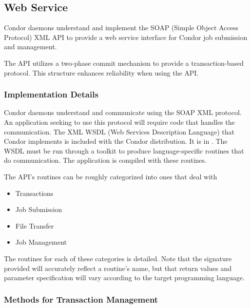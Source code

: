 \subsection{\label{API-WebService} Web Service}

Condor daemons understand and implement
the SOAP (Simple Object Access Protocol) XML API
to provide a web service interface for Condor job submission
and management.

The API utilizes a two-phase commit mechanism to provide
a transaction-based protocol.  
This structure enhances reliability when using the API.

\subsubsection{\label{WebService-Implementation} Implementation Details}

Condor daemons understand and communicate using the
SOAP XML protocol.
An application seeking to use this protocol
will require code that handles the communication.
The XML WSDL (Web Services Description Language)
that Condor implements is included with the
Condor distribution.
It is in .
The WSDL must be run through a toolkit to produce
language-specific routines that do communication.
The application is compiled with these routines.

The API's routines can be roughly categorized into ones that
deal with
\begin{itemize}
  \item Transactions
  \item Job Submission
  \item File Transfer
  \item Job Management
\end{itemize}
The routines for each of these categories is detailed.
Note that the signature provided will accurately 
reflect a routine's name, 
but that return values and parameter specification
will vary according  to the target programming language.

\subsubsection{\label{WebService-Transactions} Methods for Transaction Management}

